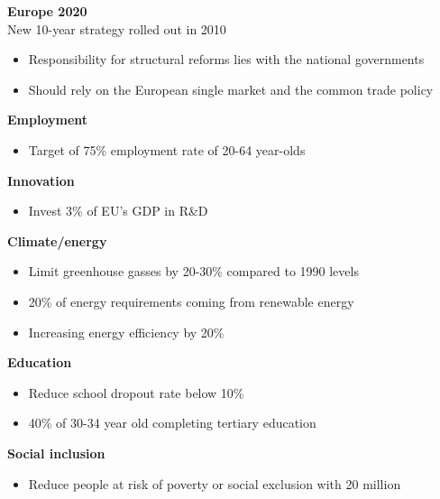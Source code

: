 \documentclass{beamer}
\begin{document}
\begin{frame}
  \textbf{Europe 2020}\\
  New 10-year strategy rolled out in 2010
  \begin{itemize}
    \item Responsibility for structural reforms lies with the national governments 
    \item Should rely on the European single market and the common trade policy
  \end{itemize}  
\end{frame}

\begin{frame}  
  \textbf{Employment}
  \begin{itemize}
    \item Target of 75\% employment rate of 20-64 year-olds
  \end{itemize}

  \textbf{Innovation}
  \begin{itemize}
    \item Invest 3\% of EU's GDP in R\&D
  \end{itemize}
  
  \textbf{Climate/energy}
  \begin{itemize}
    \item Limit greenhouse gasses by 20-30\% compared to 1990 levels
    \item 20\% of energy requirements coming from renewable energy
    \item Increasing energy efficiency by 20\%
  \end{itemize}
  
  \textbf{Education}
  \begin{itemize}
    \item Reduce school dropout rate below 10\%
    \item 40\% of 30-34 year old completing tertiary education
  \end{itemize}
  
  \textbf{Social inclusion}
  \begin{itemize}  
    \item Reduce people at risk of poverty or social exclusion with 20 million
  \end{itemize}
\end{frame}

\end{document}
